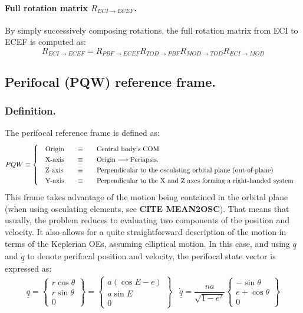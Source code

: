 		\paragraph{Full rotation matrix $R_{ECI\rightarrow ECEF}$. \\}
		\indent By simply successively composing rotations, the full rotation matrix from ECI to ECEF is computed as:
		\[
		R_{ECI\rightarrow ECEF} = R_{PBF \rightarrow ECEF} R_{TOD \rightarrow PBF} R_{MOD\rightarrow TOD} R_{ECI\rightarrow MOD}		
		\]
	\subsection{Perifocal (PQW) reference frame.} \label{sec: PQW}
		\subsubsection{Definition.}
		\indent The perifocal reference frame is defined as:
		\[
		\arraycolsep=10pt
		\def\arraystretch{1.3}
		PQW\equiv\left\{
		\begin{array}{lll}
		\text{Origin} 	& \equiv 	& \text{Central body's COM} \\
		\text{X-axis} 	& \equiv 	& \text{Origin} \longrightarrow \text{Periapsis.} \\
		\text{Z-axis} 	& \equiv 	& \text{Perpendicular to the osculating orbital plane (out-of-plane)} \\
		\text{Y-axis} 	& \equiv 	& \text{Perpendicular to the X and Z axes forming a right-handed system} \\
		\end{array}
		\right.
		\]
		\indent This frame takes advantage of the motion being contained in the orbital plane (when using osculating elements, see \textbf{CITE MEAN2OSC}). That means that usually, the problem reduces to evaluating two components of the position and velocity. It also allows for a quite straightforward description of the motion in terms of the Keplerian OEs, assuming elliptical motion. In this case, and using $\underline{q}$ and $\underline{\dot{q}}$ to denote perifocal position and velocity, the perifocal state vector is expressed as:
		\[\begin{array}{cc}
		\underline{q} = \left\{ 
		\begin{array}{c}
		r \cos \theta \\
		r \sin \theta \\
		0
		\end{array}				
		\right\} = 
		\left\{ 
		\begin{array}{c}
		a \left( \cos E - e \right) \\
		a \sin E\\
		0
		\end{array}				
		\right\} 		&
		\underline{\dot{q}} = \dfrac{na}{\sqrt{1-e^2}}
		\left\{ 
		\begin{array}{c}
		-\sin\theta\\
		e + \cos \theta\\
		0
		\end{array}				
		\right\}		
		\end{array}
		\]
